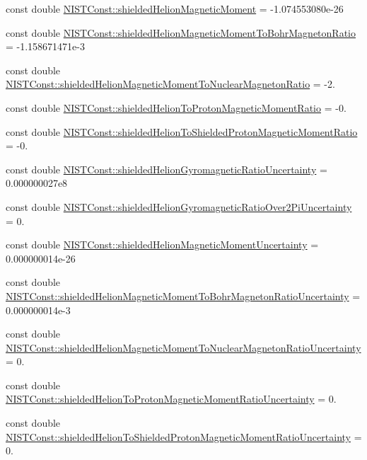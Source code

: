 \begin{DoxyCompactItemize}
\item 
const double \hyperlink{group___helion_ga1b0f92c14390afe726af4005e21c2ae8}{N\+I\+S\+T\+Const\+::shielded\+Helion\+Magnetic\+Moment} = -\/1.\+074553080e-\/26
\item 
const double \hyperlink{group___helion_gac48304d45406c207fbadeca604d5c71a}{N\+I\+S\+T\+Const\+::shielded\+Helion\+Magnetic\+Moment\+To\+Bohr\+Magneton\+Ratio} = -\/1.\+158671471e-\/3
\item 
const double \hyperlink{group___helion_gae3bf1eccb33e00a6da688959fd99bbb3}{N\+I\+S\+T\+Const\+::shielded\+Helion\+Magnetic\+Moment\+To\+Nuclear\+Magneton\+Ratio} = -\/2.
\item 
const double \hyperlink{group___helion_ga9aa0ad55bc28f6402fcd872f9435547e}{N\+I\+S\+T\+Const\+::shielded\+Helion\+To\+Proton\+Magnetic\+Moment\+Ratio} = -\/0.
\item 
const double \hyperlink{group___helion_ga3b8301672e9de426ef6bf13276b42acc}{N\+I\+S\+T\+Const\+::shielded\+Helion\+To\+Shielded\+Proton\+Magnetic\+Moment\+Ratio} = -\/0.
\item 
const double \hyperlink{group___helion_ga2f3b1faa760be34cc23805484a9de01e}{N\+I\+S\+T\+Const\+::shielded\+Helion\+Gyromagnetic\+Ratio\+Uncertainty} = 0.\+000000027e8
\item 
const double \hyperlink{group___helion_ga500ba901d47044d1bab3fb7ee6aeade1}{N\+I\+S\+T\+Const\+::shielded\+Helion\+Gyromagnetic\+Ratio\+Over2\+Pi\+Uncertainty} = 0.
\item 
const double \hyperlink{group___helion_gac193c2838d54048db06099730d41faea}{N\+I\+S\+T\+Const\+::shielded\+Helion\+Magnetic\+Moment\+Uncertainty} = 0.\+000000014e-\/26
\item 
const double \hyperlink{group___helion_ga1ec0d4d0683b482a857f58d3055b560a}{N\+I\+S\+T\+Const\+::shielded\+Helion\+Magnetic\+Moment\+To\+Bohr\+Magneton\+Ratio\+Uncertainty} = 0.\+000000014e-\/3
\item 
const double \hyperlink{group___helion_gae3df4be3b49e78f1d37afd8348e7c748}{N\+I\+S\+T\+Const\+::shielded\+Helion\+Magnetic\+Moment\+To\+Nuclear\+Magneton\+Ratio\+Uncertainty} = 0.
\item 
const double \hyperlink{group___helion_gae54711a41ac3e4b0f921afc36d756604}{N\+I\+S\+T\+Const\+::shielded\+Helion\+To\+Proton\+Magnetic\+Moment\+Ratio\+Uncertainty} = 0.
\item 
const double \hyperlink{group___helion_ga31b0f8bc042eedd046490ef6b86b26d4}{N\+I\+S\+T\+Const\+::shielded\+Helion\+To\+Shielded\+Proton\+Magnetic\+Moment\+Ratio\+Uncertainty} = 0.
\end{DoxyCompactItemize}


